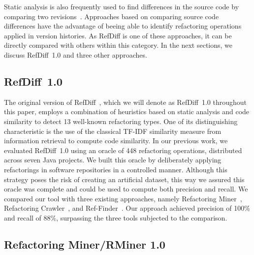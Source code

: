 \documentclass[10pt,journal,compsoc]{IEEEtran}
\begin{document}
Static analysis is also frequently used to find differences in the source code by comparing two revisions~\cite{dig2006automated, weissgerber2006identifying, tsantalis_empiricalstudy,prete2010template,Kim:2010:RefFinder,msr2017,tsantalis2018rminer}.
Approaches based on comparing source code differences have the advantage of beeing able to identify refactoring operations applied in version histories.
As RefDiff is one of these approaches, it can be directly compared with others within this category. In the next sections, we discuss RefDiff~1.0 and three other approaches.

\subsection{RefDiff~1.0}

The original version of RefDiff~\cite{msr2017}, which we will denote as RefDiff~1.0 throughout this paper, employs a combination of heuristics based on static analysis and code similarity to detect 13 well-known refactoring types.
One of its distinguishing characteristic is the use of the classical TF-IDF similarity measure from information retrieval to compute code similarity.
In our previous work, we evaluated RefDiff~1.0 using an oracle of 448 refactoring operations, distributed across seven Java projects.
We built this oracle by deliberately applying refactorings in software repositories in a controlled manner.
Although this strategy poses the risk of creating an artificial dataset, this way we assured this oracle was complete and could be used to compute both precision and recall.
We compared our tool with three existing approaches, namely Refactoring Miner~\cite{tsantalis_empiricalstudy}, Refactoring Crawler~\cite{dig2006automated}, and Ref-Finder~\cite{Kim:2010:RefFinder}.
Our approach achieved precision of 100\% and recall of 88\%, surpassing the three tools subjected to the comparison.


\subsection{Refactoring Miner/RMiner 1.0}
\end{document}
